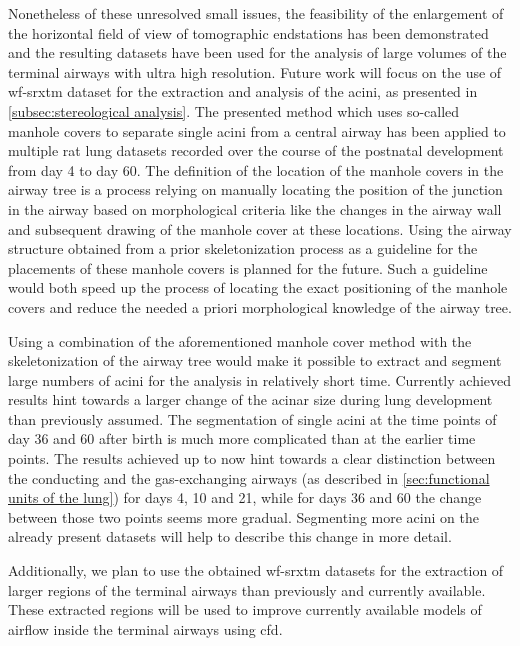 Nonetheless of these unresolved small issues, the feasibility of the enlargement of the horizontal field of view of tomographic endstations has been demonstrated and the resulting datasets have been used for the analysis of large volumes of the terminal airways with ultra high resolution. Future work will focus on the use of \ac{wf-srxtm} dataset for the extraction and analysis of the acini, as presented in \autoref{subsec:stereological analysis}. The presented method which uses so-called manhole covers to separate single acini from a central airway has been applied to multiple rat lung datasets recorded over the course of the postnatal development from day 4 to day 60. The definition of the location of the manhole covers in the airway tree is a process relying on manually locating the position of the junction in the airway based on morphological criteria like the changes in the airway wall and subsequent drawing of the manhole cover at these locations. Using the airway structure obtained from a prior skeletonization process as a guideline for the placements of these manhole covers is planned for the future. Such a guideline would both speed up the process of locating the exact positioning of the manhole covers and reduce the needed a priori morphological knowledge of the airway tree.

Using a combination of the aforementioned manhole cover method with the skeletonization of the airway tree would make it possible to extract and segment large numbers of acini for the analysis in relatively short time. Currently achieved results hint towards a larger change of the acinar size during lung development than previously assumed. The segmentation of single acini at the time points of day 36 and 60 after birth is much more complicated than at the earlier time points. The results achieved up to now hint towards a clear distinction between the conducting and the gas-exchanging airways (as described in \autoref{sec:functional units of the lung}) for days 4, 10 and 21, while for days 36 and 60 the change between those two points seems more gradual. Segmenting more acini on the already present datasets will help to describe this change in more detail. 

Additionally, we plan to use the obtained \ac{wf-srxtm} datasets for the extraction of larger regions of the terminal airways than previously and currently available. These extracted regions will be used to improve currently available models of airflow inside the terminal airways \cite{Sznitman2007,Sznitman2009}  using \ac{cfd}. 

